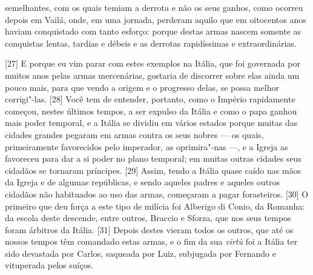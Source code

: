 semelhantes, com os quais temiam a derrota e não os seus ganhos, como
ocorreu depois em Vailá, onde, em uma jornada,
perderam aquilo que em oitocentos anos haviam conquistado com tanto esforço: porque destas
armas nascem somente as conquistas lentas, tardias e débeis e as
derrotas rapidíssimas e extraordinárias.

{[}27{]} E porque eu vim parar com estes exemplos na Itália, que foi
governada por muitos anos pelas armas mercenárias, gostaria de discorrer
sobre elas ainda um pouco mais, para que vendo a origem e o progresso
delas, se possa melhor corrigi"-las. {[}28{]} Você tem de entender,
portanto, como o Império rapidamente começou, nestes últimos tempos, a ser expulso
da Itália e como o papa ganhou mais poder temporal, e a Itália se
dividiu em vários estados porque muitas das cidades grandes pegaram em
armas contra os seus nobres --- os quais, primeiramente favorecidos pelo
imperador, as oprimira"-nas ---, e a Igreja as favoreceu para dar a si
poder no plano temporal; em muitas outras cidades seus cidadãos se
tornaram príncipes. {[}29{]} Assim, tendo a Itália
quase caído nas mãos da Igreja e de algumas repúblicas, e sendo aqueles
padres e aqueles outros cidadãos não habituados ao uso das armas,
começaram a pagar forasteiros. {[}30{]} O primeiro que deu força a este
tipo de milícia foi Alberigo di Conio,
da Romanha: da escola deste descende, entre outros, Braccio e Sforza,
que nos seus tempos foram árbitros da Itália. {[}31{]} Depois destes
vieram todos os outros, que até os nossos tempos têm comandado estas
armas, e o fim da sua \emph{virtù} foi a Itália ter sido devastada por
Carlos, saqueada por Luiz, subjugada por Fernando e vituperada pelos
suíços.

